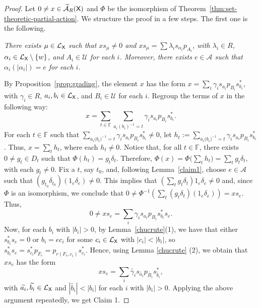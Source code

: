 \documentclass[a4paper,12pt]{amsart}
\theoremstyle{definition}
\theoremstyle{remark}
\numberwithin{equation}{section}
\newcommand{\osf}{{\normalfont \textsf{X}}}
\newcommand{\lang}{\CL_{\osf}}
\newcommand{\ualgshift}{\TCA_R(\osf)}
\newcommand{\alf}{\mathscr{A}}
\newcommand{\F}{\mathbb{F}}
\newcommand{\CA}{\mathcal{A}}
\newcommand{\CL}{\mathcal{L}}
\newcommand{\TCA}{\widetilde{\CA}}
\newcommand{\TCB}{\mathcal{U}}
\begin{document}
\begin{proof} 

Let $0\neq x\in \ualgshift$ and $\Phi$ be the isomorphism of Theorem~\ref{thm:set-theoretic-partial-action}.
We structure the proof in a few steps. The first one is the following.







\vspace{0.5pc}
 {\it There exists  $\mu\in \lang$ such that $xs_\mu\neq 0$ and $x s_\mu=\sum\limits\lambda_i s_{\alpha_i}p_{A_i}$, with $\lambda_i\in R$, $\alpha_i \in \lang\setminus \{w\}$, and $A_i\in \TCB$ for each $i$. Moreover, there exists $e\in \alf$ such that ${\alpha_i}(|\alpha_i|)=e$ for each $i$.}
\smallskip

By Proposition~\ref{prop:grading}, the element $x$ has the form $x=\sum\limits_i\gamma_i s_{a_i}p_{B_i}s_{b_i}^*$, with $\gamma_i\in R$, $a_i,b_i\in \lang$, and $B_i\in \TCB$ for each $i$. Regroup the terms of $x$ in the following way:
$$x=\sum\limits_{t\in \F}\sum\limits_{a_i{(b_i)}^{-1}=t}\gamma_i s_{a_i}p_{B_i}s_{b_i}^*.$$ For each $t\in \F$ such that $\sum\limits_{a_i{(b_i})^{-1}=t}\gamma_i s_{a_i}p_{B_i}s_{b_i}^*\neq 0$, let $h_t:=\sum\limits_{a_i{(b_i})^{-1}=t}\gamma_i s_{a_i}p_{B_i}s_{b_i}^*$. Thus, $x=\sum\limits_{t}h_t$, where each $h_t\neq 0$.  Notice that, for all $t \in \F$, there exists $0\neq g_t\in D_t$ such that $\Phi(h_t)=g_t\delta_t$. Therefore, 
$\Phi(x)=\Phi\big(\sum\limits_t h_t\big)=\sum\limits_t g_t\delta_t,$ with each $g_t\neq 0$. Fix a $t$, say $t_0$, and, following Lemma~\ref{claim1}, choose $e\in \alf$ such that $(g_{t_0}\delta_{t_0}) (1_e\delta_e)\neq 0$. This implies that $\left(\sum_t g_t \delta_t \right) 1_e \delta_e \neq 0$ and, since $\Phi$ is an isomorphism, we conclude that $0\neq \Phi^{-1}(\sum_t (g_t\delta_t) (1_e\delta_e))=xs_e$.
Thus, $$0\neq xs_e=\sum_i \gamma_i s_{a_i}p_{B_i}s_{b_i}^*s_e.$$ Now, for each $b_i$ with $|b_i|>0$, by Lemma~\ref{chucrute}(1), we have that either $s_{b_i}^*s_e=0$ or $b_i=ec_i$ for some $c_i \in \lang$ with $|c_i|< |b_i|$, so $s_{b_i}^*s_e=s_{c_i}^*p_{F_e}=p_{r(F_e,c_i)}s_{c_i}^*$. Hence, using Lemma \ref{chucrute} (2), we obtain that $xs_e$ has the form
$$xs_e=\sum\limits_i {\widetilde{\gamma_i}}s_{\widetilde{a_i}}p_{\widetilde{B_i}}s_{\widetilde{b_i}}^*,$$
 with $\widetilde{a_i}, \widetilde{b_i}\in \lang$ and 
 $|\widetilde{b_i}|<|b_i|$ for each $i$ with $|b_i|>0$. Applying the above argument repeatedly, we get Claim 1.


\end{proof}
\end{document}
